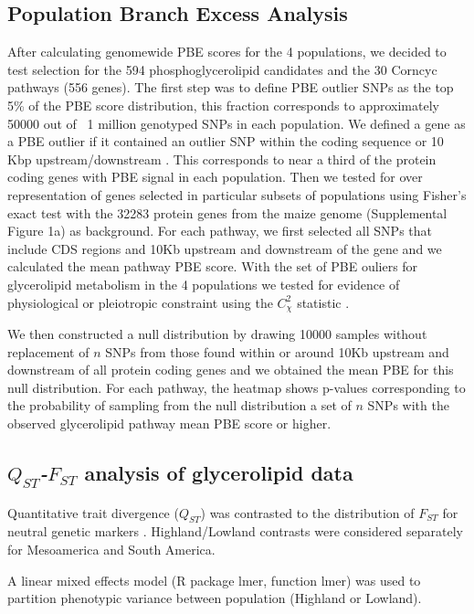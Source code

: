 \documentclass[9pt,twocolumn,twoside,lineno]{gsajnl}
\begin{document}
\subsection{Population Branch Excess Analysis}
After calculating genomewide PBE scores for the 4 populations, we decided to test selection for the 594 phosphoglycerolipid candidates and the 30 Corncyc pathways (556 genes). 
The first step was to define PBE outlier SNPs as the top 5\% of the PBE score distribution, this fraction corresponds to approximately 50000 out of ~1 million genotyped SNPs in each population. 
We defined a gene as a PBE outlier if it contained an outlier SNP within the coding sequence or 10 Kbp upstream/downstream  \cite{Wang2020-mp}. 
This corresponds to near a third of the protein coding genes with PBE signal in each population. 
Then we tested for over representation of genes selected in particular subsets of populations using Fisher's exact test with the 32283 protein genes from the maize genome (Supplemental Figure 1a) \cite{wang2015a} as background. 
For each pathway, we first selected all SNPs that include CDS regions and 10Kb upstream and downstream of the gene and we calculated the mean pathway PBE score. 
With the set of PBE ouliers for glycerolipid metabolism in the 4 populations we tested for evidence of physiological or pleiotropic constraint using the $C_\chi^2$ statistic \cite{yeaman2018}. 

We then constructed a null distribution by drawing 10000 samples without replacement of $n$ SNPs from those found within or around 10Kb upstream and downstream of all protein coding genes and we obtained the mean PBE for this null distribution. 
For each pathway, the heatmap shows p-values corresponding to the probability of sampling from the null distribution a set of $n$ SNPs with the observed glycerolipid pathway mean PBE score or higher.



\subsection{\textit{$Q_{ST}$-$F_{ST}$} analysis of glycerolipid data}

Quantitative trait divergence ($Q_{ST}$) was contrasted to the distribution of $F_{ST}$ for neutral genetic markers \citep{whitlock2008evolutionary}.
Highland/Lowland contrasts were considered separately for Mesoamerica and South America.

A linear mixed effects model (R package lmer, function lmer) was used to partition phenotypic variance between population (Highland or Lowland).
\end{document}
